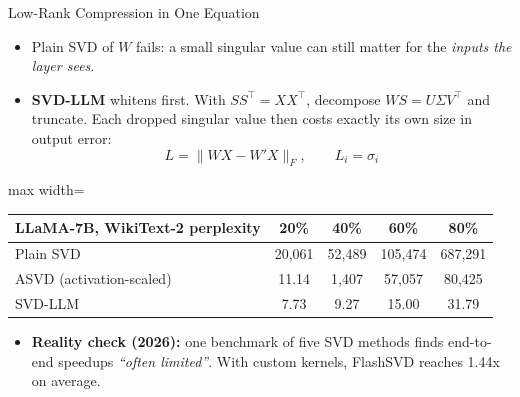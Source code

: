 \begin{frame}{Low-Rank Compression in One Equation}
    \begin{itemize}\itemsep0.3em
        \item Plain SVD of $W$ fails: a small singular value can still matter for the \emph{inputs the layer sees}.
        \item \textbf{SVD-LLM} whitens first. With $SS^\top = XX^\top$, decompose $WS = U\Sigma V^\top$ and truncate. Each dropped singular value then costs exactly its own size in output error:
        \[
            L = \lVert WX - W'X\rVert_F, \qquad L_i = \sigma_i
        \]
    \end{itemize}
    \begin{center}
    \small
    \begin{adjustbox}{max width=\linewidth}\begin{tabular}{lcccc}
        \toprule
        \textbf{LLaMA-7B, WikiText-2 perplexity} & \textbf{20\%} & \textbf{40\%} & \textbf{60\%} & \textbf{80\%} \\
        \midrule
        Plain SVD & 20,061 & 52,489 & 105,474 & 687,291 \\
        ASVD (activation-scaled) & 11.14 & 1,407 & 57,057 & 80,425 \\
        \rowcolor{KAUSTcyan!12} SVD-LLM & 7.73 & 9.27 & 15.00 & 31.79 \\
        \bottomrule
    \end{tabular}\end{adjustbox}
    \end{center}
    \begin{itemize}\itemsep0.3em
        \item \textbf{Reality check (2026):} one benchmark of five SVD methods finds end-to-end speedups \emph{``often limited''}. With custom kernels, FlashSVD reaches 1.44x on average.
    \end{itemize}
\end{frame}

